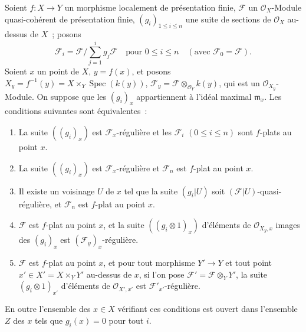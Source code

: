 \begin{theorem}[11.3.8]
\label{IV.11.3.8-fr}
Soient $f:X\to Y$ un morphisme localement de présentation finie,
$\mathcal F$ un $\mathcal O_X$-Module quasi-cohérent de présentation finie,
$(g_i)_{1\leq i\leq n}$ une suite de sections de $\mathcal O_X$ au-dessus de
$X$~; posons
\[
\mathcal F_i=\mathcal F\big/\sum_{j=1}^{i}g_j\mathcal F
\quad\text{pour }0\leq i\leq n
\quad(\text{avec }\mathcal F_0=\mathcal F).
\]
Soient $x$ un point de $X$, $y=f(x)$, et posons
$X_y=f^{-1}(y)=X\times_Y\operatorname{Spec}(k(y))$,
$\mathcal F_y=\mathcal F\otimes_{\mathcal O_Y}k(y)$, qui est un
$\mathcal O_{X_y}$-Module. On suppose que les $(g_i)_x$ appartiennent à l'idéal
maximal $\mathfrak m_x$. Les conditions suivantes sont équivalentes~:
\begin{enumerate}[label=\emph{\alph*)}]
\item La suite $((g_i)_x)$ est $\mathcal F_x$-régulière et les $\mathcal F_i$
$(0\leq i\leq n)$ sont $f$-plats au point $x$.
\item La suite $((g_i)_x)$ est $\mathcal F_x$-régulière et $\mathcal F_n$ est
$f$-plat au point $x$.
\item[\emph{b$'$)}] Il existe un voisinage $U$ de $x$ tel que la suite
$(g_i|U)$ soit $(\mathcal F|U)$-quasi-régulière, et $\mathcal F_n$ est
$f$-plat au point $x$.


\item $\mathcal F$ est $f$-plat au point $x$, et la suite
$((g_i\otimes1)_x)$ d'éléments de $\mathcal O_{X_y,x}$ images des $(g_i)_x$ est
$(\mathcal F_y)_x$-régulière.
\item $\mathcal F$ est $f$-plat au point $x$, et pour tout morphisme
$Y'\to Y$ et tout point $x'\in X'=X\times_YY'$ au-dessus de $x$, si l'on pose
$\mathcal F'=\mathcal F\otimes_YY'$, la suite $(g_i\otimes1)_{x'}$
d'éléments de $\mathcal O_{X',x'}$ est $\mathcal F'_{x'}$-régulière.
\end{enumerate}
En outre l'ensemble des $x\in X$ vérifiant ces conditions est ouvert dans
l'ensemble $Z$ des $x$ tels que $g_i(x)=0$ pour tout $i$.
\end{theorem}

